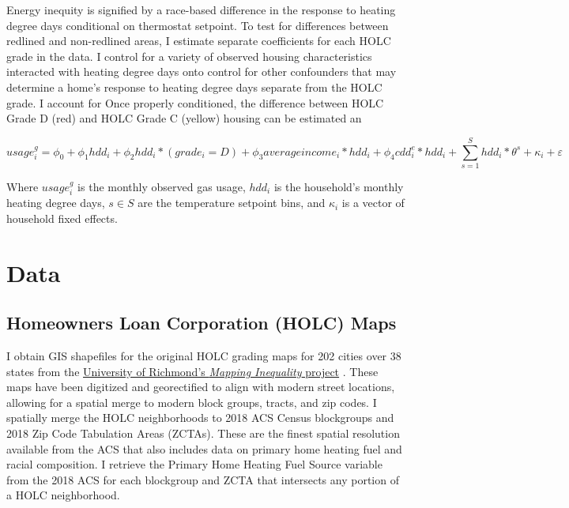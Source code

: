 \documentclass[
]{article}
\begin{document}
Energy inequity is signified by a race-based difference in the response to heating degree days conditional on thermostat setpoint. To test for differences between redlined and non-redlined areas, I estimate separate coefficients for each HOLC grade in the data. I control for a variety of observed housing characteristics interacted with heating degree days onto control for other confounders that may determine a home's response to heating degree days separate from the HOLC grade. I account for Once properly conditioned, the difference between HOLC Grade D (red) and HOLC Grade C (yellow) housing can be estimated an

\[usage^g_i = \phi_0 + \phi_1 hdd_i + \phi_2 hdd_i*(grade_i=D) + \phi_3 averageincome_i*hdd_i + \phi_4 cdd^e_i*hdd_i + \sum_{s=1}^{S} hdd_i*\theta^s + \kappa_i + \varepsilon\]

Where \(usage^g_i\) is the monthly observed gas usage, \(hdd_i\) is the household's monthly heating degree days, \(s\in S\) are the temperature setpoint bins, and \(\kappa_i\) is a vector of household fixed effects.

\hypertarget{data}{%
\section{Data}\label{data}}

\hypertarget{homeowners-loan-corporation-holc-maps}{%
\subsection{Homeowners Loan Corporation (HOLC) Maps}\label{homeowners-loan-corporation-holc-maps}}

I obtain GIS shapefiles for the original HOLC grading maps for 202 cities over 38 states from the \href{https://dsl.richmond.edu/panorama/redlining/}{University of Richmond's \textit{Mapping Inequality} project} \citep{Nelson2021}. These maps have been digitized and georectified to align with modern street locations, allowing for a spatial merge to modern block groups, tracts, and zip codes. I spatially merge the HOLC neighborhoods to 2018 ACS Census blockgroups and 2018 Zip Code Tabulation Areas (ZCTAs). These are the finest spatial resolution available from the ACS that also includes data on primary home heating fuel and racial composition. I retrieve the Primary Home Heating Fuel Source variable from the 2018 ACS for each blockgroup and ZCTA that intersects any portion of a HOLC neighborhood.
\end{document}
